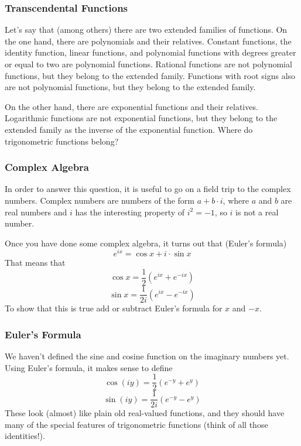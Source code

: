 \documentclass[xcolor=dvipsnames]{beamer}
\begin{document}
\begin{frame}
  \frametitle{Transcendental Functions}
Let's say that (among others) there are two extended families of
functions. On the one hand, there are \alert{polynomials} and their
relatives. Constant functions, the identity function, linear
functions, and polynomial functions with degrees greater or equal to
two are polynomial functions. Rational functions are not polynomial
functions, but they belong to the extended family. Functions with root
signs also are not polynomial functions, but they belong to the
extended family.

\bigskip

On the other hand, there are \alert{exponential functions} and their
relatives. Logarithmic functions are not exponential functions, but
they belong to the extended family as the inverse of the exponential
function. Where do trigonometric functions belong?
\end{frame}

\begin{frame}
  \frametitle{Complex Algebra}
  In order to answer this question, it is useful to go on a field trip
  to the complex numbers. Complex numbers are numbers of the form
  $a+b\cdot{}i$, where $a$ and $b$ are real numbers and $i$ has the
  interesting property of $i^{2}=-1$, so $i$ is not a real number.

\bigskip

Once you have done some complex algebra, it turns out that (Euler's formula)
\begin{equation}
  \label{eq:siquohjo}
  e^{ix}=\cos{}x+i\cdot{}\sin{}x  
\end{equation}
That means that
\begin{equation}
  \label{eq:oixiekae}
  \cos{}x=\frac{1}{2}\left(e^{ix}+e^{-ix}\right)
\end{equation}
\begin{equation}
  \label{eq:aurooshi}
  \sin{}x=\frac{1}{2i}\left(e^{ix}-e^{-ix}\right)
\end{equation}
To show that this is true add or subtract Euler's formula for $x$ and $-x$.
\end{frame}

\begin{frame}
  \frametitle{Euler's Formula}
We haven't defined the sine and cosine function on the imaginary
numbers yet. Using Euler's formula, it makes sense to define
\begin{equation}
  \label{eq:xohzunei}
  \cos(iy)=\frac{1}{2}\left(e^{-y}+e^{y}\right)
\end{equation}
\begin{equation}
  \label{eq:eeghaefi}
  \sin(iy)=\frac{1}{2i}\left(e^{-y}-e^{y}\right)
\end{equation}
These look (almost) like plain old real-valued functions, and they
should have many of the special features of trigonometric functions
(think of all those identities!).
\end{frame}
\end{document}

